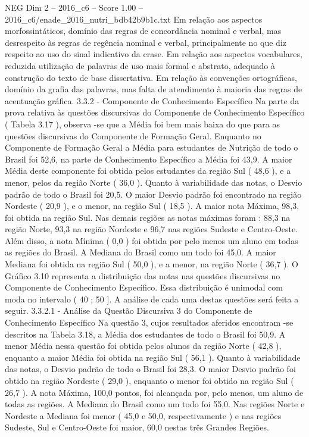 \begin{textsample}{NEG Dim 2 – 2016\_c6 – Score 1.00 – 2016\_c6/enade\_2016\_nutri\_bdb42b9b1c.txt}
Em relação aos aspectos morfossintáticos, domínio das regras de concordância nominal e verbal, mas desrespeito às regras de regência nominal e verbal, principalmente no que diz respeito ao uso do sinal indicativo da crase.
Em relação aos aspectos vocabulares, reduzida utilização de palavras de uso mais formal e abstrato, adequado à construção do texto de base dissertativa.
Em relação às convenções ortográficas, domínio da grafia das palavras, mas falta de atendimento à maioria das regras de acentuação gráfica. 3.3.2 - Componente de Conhecimento Específico Na parte da prova relativa às questões discursivas do Componente de Conhecimento Específico ( Tabela 3.17 ), observa -se que a Média foi bem mais baixa do que para as questões discursivas do Componente de Formação Geral.
Enquanto no Componente de Formação Geral a Média para estudantes de Nutrição de todo o Brasil foi 52,6, na parte de Conhecimento Específico a Média foi 43,9.
A maior Média deste componente foi obtida pelos estudantes da região Sul ( 48,6 ), e a menor, pelos da região Norte ( 36,0 ).
Quanto à variabilidade das notas, o Desvio padrão de todo o Brasil foi 20,5.
O maior Desvio padrão foi encontrado na região Nordeste ( 20,9 ), e o menor, na região Sul ( 18,5 ).
A maior nota Máxima, 98,3, foi obtida na região Sul.
Nas demais regiões as notas máximas foram : 88,3 na região Norte, 93,3 na região Nordeste e 96,7 nas regiões Sudeste e Centro-Oeste.
Além disso, a nota Mínima ( 0,0 ) foi obtida por pelo menos um aluno em todas as regiões do Brasil.
A Mediana do Brasil como um todo foi 45,0.
A maior Mediana foi obtida na região Sul ( 50,0 ), e a menor, na região Norte ( 36,7 ).
O Gráfico 3.10 representa a distribuição das notas nas questões discursivas no Componente de Conhecimento Específico.
Essa distribuição é unimodal com moda no intervalo ( 40 ; 50 ].
A análise de cada uma destas questões será feita a seguir. 3.3.2.1 - Análise da Questão Discursiva 3 do Componente de Conhecimento Específico Na questão 3, cujos resultados aferidos encontram -se descritos na Tabela 3.18, a Média dos estudantes de todo o Brasil foi 50,9.
A menor Média nessa questão foi obtida pelos alunos da região Norte ( 42,8 ), enquanto a maior Média foi obtida na região Sul ( 56,1 ).
Quanto à variabilidade das notas, o Desvio padrão de todo o Brasil foi 28,3.
O maior Desvio padrão foi obtido na região Nordeste ( 29,0 ), enquanto o menor foi obtido na região Sul ( 26,7 ).
A nota Máxima, 100,0 pontos, foi alcançada por, pelo menos, um aluno de todas as regiões.
A Mediana do Brasil como um todo foi 55,0.
Nas regiões Norte e Nordeste a Mediana foi menor ( 45,0 e 50,0, respectivamente ) e nas regiões Sudeste, Sul e Centro-Oeste foi maior, 60,0 nestas três Grandes Regiões.

\end{textsample}
